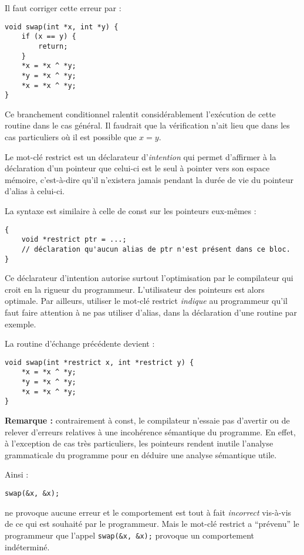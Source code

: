 \documentclass[../../../main.tex]{subfiles}
\begin{document}
Il faut corriger cette erreur par :
\begin{verbatim}
void swap(int *x, int *y) {
	if (x == y) {
		return;
	}
	*x = *x ^ *y;
	*y = *x ^ *y;
	*x = *x ^ *y;
}
\end{verbatim}
Ce branchement conditionnel ralentit considérablement l'exécution de cette routine dans le cas général. Il faudrait que la vérification n'ait lieu que dans les cas particuliers où il est possible que $x = y$.

Le mot-clé \textsf{restrict} est un déclarateur d'\textit{intention} qui permet d'affirmer à la déclaration d'un pointeur que celui-ci est le seul à pointer vers son espace mémoire, c'est-à-dire qu'il n'existera jamais pendant la durée de vie du pointeur d'alias à celui-ci. 

La syntaxe est similaire à celle de \textsf{const} sur les pointeurs eux-mêmes :
\begin{verbatim}
{
	void *restrict ptr = ...;
	// déclaration qu'aucun alias de ptr n'est présent dans ce bloc.
}
\end{verbatim}
Ce déclarateur d'intention autorise surtout l'optimisation par le compilateur qui croit en la rigueur du programmeur. L'utilisateur des pointeurs est alors optimale. Par ailleurs, utiliser le mot-clé \textsf{restrict} \textit{indique} au programmeur qu'il faut faire attention à ne pas utiliser d'alias, dans la déclaration d'une routine par exemple.

La routine d'échange précédente devient :
\begin{verbatim}
void swap(int *restrict x, int *restrict y) {
	*x = *x ^ *y;
	*y = *x ^ *y;
	*x = *x ^ *y;
}
\end{verbatim}
\textbf{Remarque :} contrairement à \textsf{const}, le compilateur n'essaie pas d'avertir ou de relever d'erreurs relatives à une incohérence sémantique du programme. En effet, à l'exception de cas très particuliers, les pointeurs rendent inutile l'analyse grammaticale du programme pour en déduire une analyse sémantique utile.

Ainsi :
\begin{verbatim}
swap(&x, &x);
\end{verbatim}
ne provoque aucune erreur et le comportement est tout à fait \textit{incorrect} vis-à-vis de ce qui est souhaité par le programmeur. Mais le mot-clé \textsf{restrict} a ``prévenu'' le programmeur que l'appel \texttt{swap(&x, &x);} provoque un comportement indéterminé.
\end{document}
